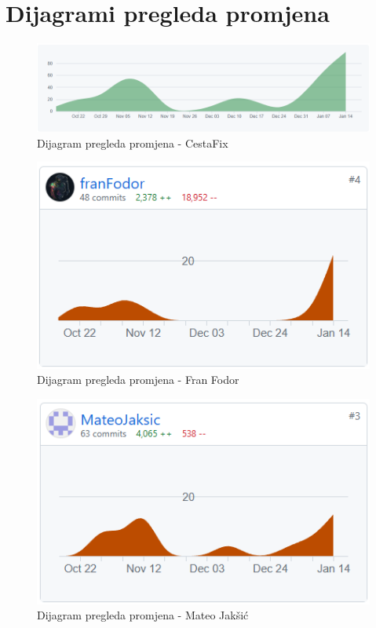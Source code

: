 					
		\eject
		\section*{Dijagrami pregleda promjena}
	
		\begin{figure}[H]
			\includegraphics[scale=0.70]{slike/DPP.png} %
			\centering
			\caption{Dijagram pregleda promjena - CestaFix}
			\label{fig:DijagramPregledaPromjena}
		\end{figure}

		\begin{figure}[H]
			\includegraphics[scale=0.80]{slike/fran.png} %
			\centering
			\caption{Dijagram pregleda promjena - Fran Fodor}
			\label{fig:DijagramPregledaPromjena}
		\end{figure}

		\begin{figure}[H]
			\includegraphics[scale=0.80]{slike/mateo.png} %
			\centering
			\caption{Dijagram pregleda promjena - Mateo Jakšić}
			\label{fig:DijagramPregledaPromjena}
		\end{figure}

